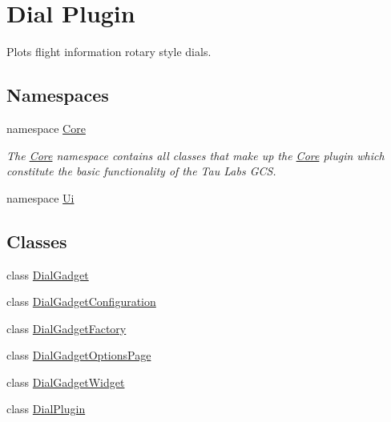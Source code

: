 \hypertarget{group___dial_plugin}{\section{Dial Plugin}
\label{group___dial_plugin}
}


Plots flight information rotary style dials.  


\subsection*{Namespaces}
\begin{DoxyCompactItemize}
\item 
namespace \hyperlink{namespace_core}{Core}
\begin{DoxyCompactList}\small\item\em The \hyperlink{namespace_core}{Core} namespace contains all classes that make up the \hyperlink{namespace_core}{Core} plugin which constitute the basic functionality of the Tau Labs G\-C\-S. \end{DoxyCompactList}\item 
namespace \hyperlink{namespace_ui}{Ui}
\end{DoxyCompactItemize}
\subsection*{Classes}
\begin{DoxyCompactItemize}
\item 
class \hyperlink{class_dial_gadget}{Dial\-Gadget}
\item 
class \hyperlink{class_dial_gadget_configuration}{Dial\-Gadget\-Configuration}
\item 
class \hyperlink{class_dial_gadget_factory}{Dial\-Gadget\-Factory}
\item 
class \hyperlink{class_dial_gadget_options_page}{Dial\-Gadget\-Options\-Page}
\item 
class \hyperlink{class_dial_gadget_widget}{Dial\-Gadget\-Widget}
\item 
class \hyperlink{class_dial_plugin}{Dial\-Plugin}
\end{DoxyCompactItemize}
